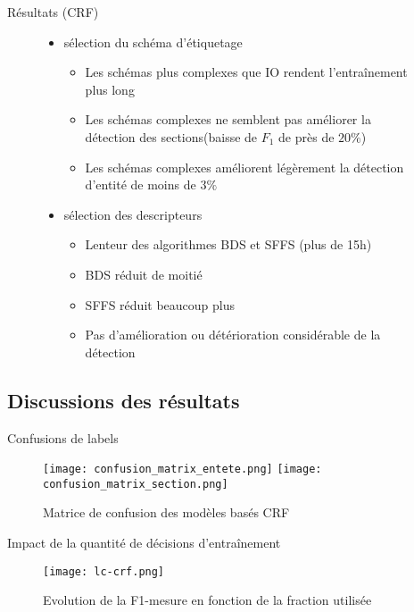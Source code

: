 \begin{frame}[t]{\mysubsectiontitle}
	Résultats (CRF)
\begin{figure}
	\begin{itemize}
		\item sélection du schéma d'étiquetage
		\begin{itemize}
			\item Les schémas plus complexes que IO rendent l'entraînement plus long
			\item Les schémas complexes ne semblent pas améliorer la détection des sections(baisse de $F_1$ de près de $20\%$)
			\item Les schémas complexes améliorent légèrement la détection d'entité de moins de $3\%$
		\end{itemize}
		\item sélection des descripteurs
		\begin{itemize}
			\item Lenteur des algorithmes BDS et SFFS (plus de 15h)
			\item BDS réduit de moitié
			\item SFFS réduit beaucoup plus
			\item Pas d'amélioration ou détérioration considérable de la détection
		\end{itemize}
	\end{itemize}
\end{figure}
\end{frame}

\subsection{Discussions des résultats}
\begin{frame}[t]{\mysubsectiontitle}
	Confusions de labels
\begin{figure}[!htb]
	\centering
	\texttt{[image: confusion\_matrix\_entete.png]} \hfill
	\texttt{[image: confusion\_matrix\_section.png]}
	\caption{Matrice de confusion des modèles basés CRF}
	\label{fig:structuration:matrice-confusion-entete}
\end{figure}
\end{frame}

\begin{frame}[t]{\mysubsectiontitle}
	Impact de la quantité de décisions d'entraînement
\begin{figure}[!h]
\texttt{[image: lc-crf.png]}
\caption{Evolution de la F1-mesure en fonction de la fraction utilisée}\label{p4_crf-learning-curves}
\end{figure}
\end{frame}

